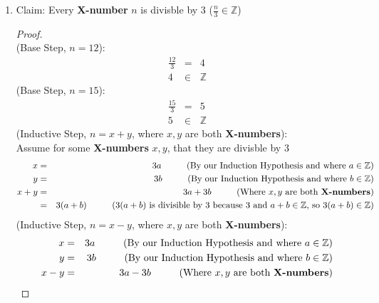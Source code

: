 \documentclass{article}
\begin{document}
\begin{enumerate}
\begin{proof}
\begin{eqnarray}
            &=& \verb|len|(L)
        \end{eqnarray}
    \end{proof}
    \item Claim: Every \textbf{X-number} $n$ is divisble by $3$ ($\frac{n}{3} \in \mathbb{Z}$)
    \begin{proof}
        \text{} \\
        (Base Step, $n = 12$):
        \begin{eqnarray}
            \frac{12}{3} &=& 4 \\
            4 &\in& \mathbb{Z}
        \end{eqnarray}
        (Base Step, $n = 15$):
        \begin{eqnarray}
            \frac{15}{3} &=& 5 \\
            5 &\in& \mathbb{Z}
        \end{eqnarray}
        (Inductive Step, $n = x+y$, where $x,y$ are both \textbf{X-numbers}): \\
        Assume for some \textbf{X-numbers} $x,y$, that they are divisble by $3$
        \begin{eqnarray}
            x &=& 3a \hspace{1cm} \text{(By our Induction Hypothesis and where $a \in \mathbb{Z}$)} \\
            y &=& 3b \hspace{1cm} \text{(By our Induction Hypothesis and where $b \in \mathbb{Z}$)} \\
            x+y &=& 3a + 3b \hspace{1cm} \text{(Where $x,y$ are both \textbf{X-numbers})} \\
            &=& 3(a+b) \hspace{1cm} \text{($3(a+b)$ is divisible by $3$ because $3$ and $a+b \in \mathbb{Z}$, so $3(a+b) \in \mathbb{Z}$)}
        \end{eqnarray}
        (Inductive Step, $n = x-y$, where $x,y$ are both \textbf{X-numbers}): \\
        \begin{eqnarray}
            x &=& 3a \hspace{1cm} \text{(By our Induction Hypothesis and where $a \in \mathbb{Z}$)} \\
            y &=& 3b \hspace{1cm} \text{(By our Induction Hypothesis and where $b \in \mathbb{Z}$)} \\
            x-y &=& 3a - 3b \hspace{1cm} \text{(Where $x,y$ are both \textbf{X-numbers})} \\

\end{eqnarray}
\end{proof}
\end{enumerate}
\end{document}
